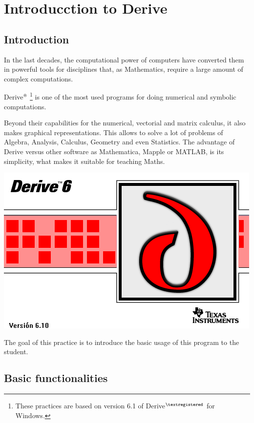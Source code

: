 \chapter{Introducction to Derive}

\section{Introduction}
In the last decades, the computational power of computers have converted them in powerful tools for disciplines that, as Mathematics, require a large amount of complex computations.

Derive$^{\textsf{\textregistered}}$
\renewcommand{\thefootnote}{\fnsymbol{footnote}}\footnote{These practices are based on version 6.1 of Derive$^{\textregistered}$ for Windows.} is one of the most used programs for doing numerical and symbolic computations.  

Beyond their capabilities for the numerical, vectorial and matrix calculus, it also makes graphical representations. 
This allows to solve a lot of problems of Algebra, Analysis, Calculus, Geometry and even Statistics. 
The advantage of Derive versus other software as Mathematica, Mapple or MATLAB, is its simplicity, what makes it suitable for teaching Maths. 

\begin{center}
\includegraphics[scale=0.6]{img/introduction/introduction}
\end{center}


The goal of this practice is to introduce the basic usage of this program to the student. 


\section{Basic functionalities}
